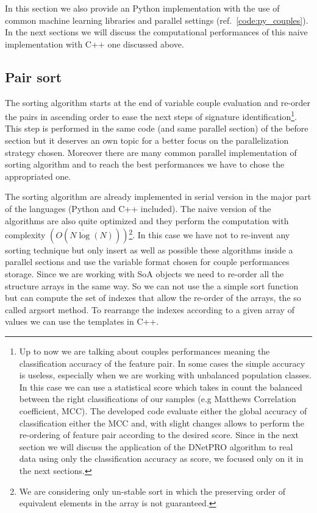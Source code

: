 \documentclass{standalone}
\begin{document}
In this section we also provide an  Python implementation with the use of common machine learning libraries and parallel settings (ref.~\ref{code:py_couples}).
In the next sections we will discuss the computational performances of this naive implementation with C++ one discussed above.



\subsection[Sorting]{Pair sort}\label{implementation:sort}

The sorting algorithm starts at the end of variable couple evaluation and re-order the pairs in ascending order to ease the next steps of signature identification\footnote{
  Up to now we are talking about couples performances meaning the classification accuracy of the feature pair.
  In some cases the simple accuracy is useless, especially when we are working with unbalanced population classes.
  In this case we can use a statistical score which takes in count the balanced between the right classifications of our samples (e.g Matthews Correlation coefficient, MCC).
  The developed code evaluate either the global accuracy of classification either the MCC and, with slight changes allows to perform the re-ordering of feature pair according to the desired score.
  Since in the next section we will discuss the application of the DNetPRO algorithm to real data using only the classification accuracy as score, we focused only on it in the next sections.
}.
This step is performed in the same code (and same parallel section) of the before section but it deserves an own topic for a better focus on the parallelization strategy chosen.
Moreover there are many common parallel implementation of sorting algorithm and to reach the best performances we have to chose the appropriated one.

The sorting algorithm are already implemented in serial version in the major part of the languages (Python and C++ included).
The naive version of the algorithms are also quite optimized and they perform the computation with complexity $(O(N\dot\log(N)))$\footnote{
  We are considering only un-stable sort in which the preserving order of equivalent elements in the array is not guaranteed.
}.
In this case we have not to re-invent any sorting technique but only insert as well as possible these algorithms inside a parallel sections and use the variable format chosen for couple performances storage.
Since we are working with SoA objects we need to re-order all the structure arrays in the same way.
So we can not use the a simple sort function but can compute the set of indexes that allow the re-order of the arrays, the so called \textsf{argsort} method.
To rearrange the indexes according to a given array of values we can use the templates in C++.
\end{document}
